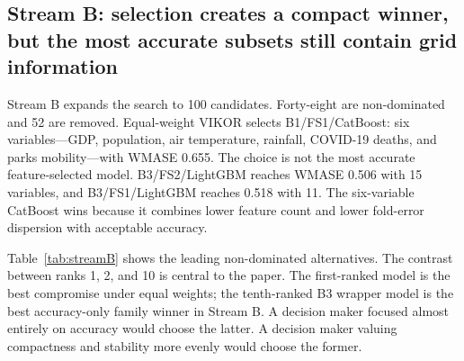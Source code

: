 \documentclass[preprint,12pt]{elsarticle}
\begin{document}
\subsection{Stream B: selection creates a compact winner, but the most accurate subsets still contain grid information}

Stream B expands the search to 100 candidates. Forty-eight are non-dominated and 52 are removed. Equal-weight VIKOR selects B1/FS1/CatBoost: six variables---GDP, population, air temperature, rainfall, COVID-19 deaths, and parks mobility---with WMASE 0.655. The choice is not the most accurate feature-selected model. B3/FS2/LightGBM reaches WMASE 0.506 with 15 variables, and B3/FS1/LightGBM reaches 0.518 with 11. The six-variable CatBoost wins because it combines lower feature count and lower fold-error dispersion with acceptable accuracy.

Table~\ref{tab:streamB} shows the leading non-dominated alternatives. The contrast between ranks 1, 2, and 10 is central to the paper. The first-ranked model is the best compromise under equal weights; the tenth-ranked B3 wrapper model is the best accuracy-only family winner in Stream B. A decision maker focused almost entirely on accuracy would choose the latter. A decision maker valuing compactness and stability more evenly would choose the former.
\end{document}
